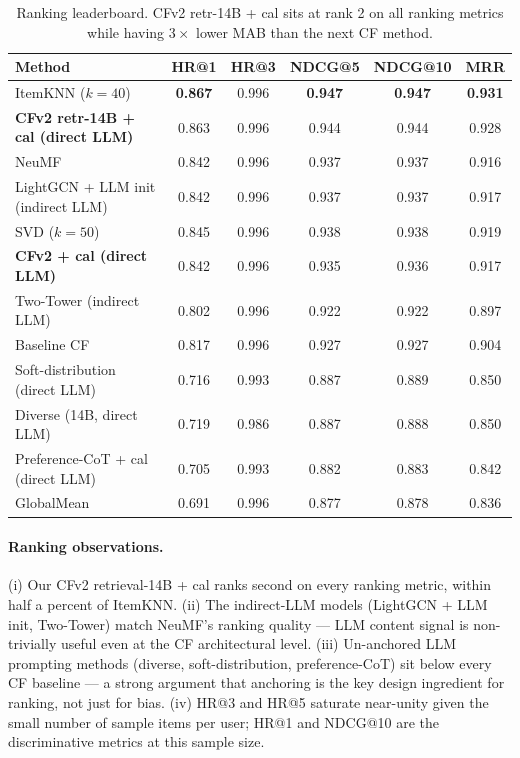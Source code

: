 \documentclass[11pt,a4paper]{article}
\newcommand{\best}[1]{\textcolor{goodgreen}{\textbf{#1}}}
\begin{document}
\begin{table}[H]
\centering\small
\caption{Ranking leaderboard. CFv2 retr-14B + cal sits at rank 2 on all
ranking metrics while having $3\times$ lower MAB than the next CF method.}
\label{tab:ranking}
\begin{tabularx}{\linewidth}{Xccccc}
\toprule
Method & HR@1 & HR@3 & NDCG@5 & NDCG@10 & MRR \\ \midrule
ItemKNN ($k{=}40$)                             & \best{0.867} & 0.996 & \best{0.947} & \best{0.947} & \best{0.931} \\
\rowcolor{goodgreen!15}
\textbf{CFv2 retr-14B + cal (direct LLM)}      & 0.863 & 0.996 & 0.944 & 0.944 & 0.928 \\
NeuMF                                          & 0.842 & 0.996 & 0.937 & 0.937 & 0.916 \\
LightGCN + LLM init (indirect LLM)             & 0.842 & 0.996 & 0.937 & 0.937 & 0.917 \\
SVD ($k{=}50$)                                 & 0.845 & 0.996 & 0.938 & 0.938 & 0.919 \\
\rowcolor{goodgreen!15}
\textbf{CFv2 + cal (direct LLM)}               & 0.842 & 0.996 & 0.935 & 0.936 & 0.917 \\
Two-Tower (indirect LLM)                       & 0.802 & 0.996 & 0.922 & 0.922 & 0.897 \\
Baseline CF                                    & 0.817 & 0.996 & 0.927 & 0.927 & 0.904 \\
Soft-distribution (direct LLM)                 & 0.716 & 0.993 & 0.887 & 0.889 & 0.850 \\
Diverse (14B, direct LLM)                      & 0.719 & 0.986 & 0.887 & 0.888 & 0.850 \\
Preference-CoT + cal (direct LLM)              & 0.705 & 0.993 & 0.882 & 0.883 & 0.842 \\
GlobalMean                                     & 0.691 & 0.996 & 0.877 & 0.878 & 0.836 \\
\bottomrule
\end{tabularx}
\end{table}

\paragraph{Ranking observations.}
(i) Our CFv2 retrieval-14B + cal ranks second on every ranking metric,
within half a percent of ItemKNN. (ii) The indirect-LLM models
(LightGCN + LLM init, Two-Tower) match NeuMF's ranking quality --- LLM
content signal is non-trivially useful even at the CF architectural
level. (iii) Un-anchored LLM prompting methods
(diverse, soft-distribution, preference-CoT) sit below every CF baseline
--- a strong argument that anchoring is the key design ingredient for
ranking, not just for bias. (iv) HR@3 and HR@5 saturate near-unity given
the small number of sample items per user; HR@1 and NDCG@10 are the
discriminative metrics at this sample size.
\end{document}
